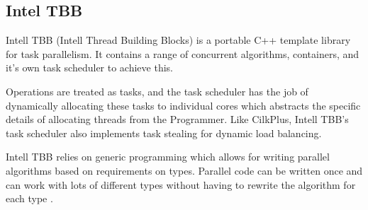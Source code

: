 \subsection{Intel TBB}

Intell TBB (Intell Thread Building Blocks) is a portable C++ template library for task parallelism.
It contains a range of concurrent algorithms, containers, and it's own task scheduler to achieve this\cite{tbb}.

Operations are treated as tasks, and the task scheduler has the job of dynamically allocating these tasks 
to individual cores which abstracts the specific details of allocating threads from the Programmer. Like CilkPlus,
Intell TBB's task scheduler also implements task stealing for dynamic load balancing\cite{tbbschedule}.

Intell TBB relies on generic programming which allows for writing parallel algorithms based on 
requirements on types. Parallel code can be written once and can work with lots of different
types without having to rewrite the algorithm for each type \cite{tbbbenefits}.
